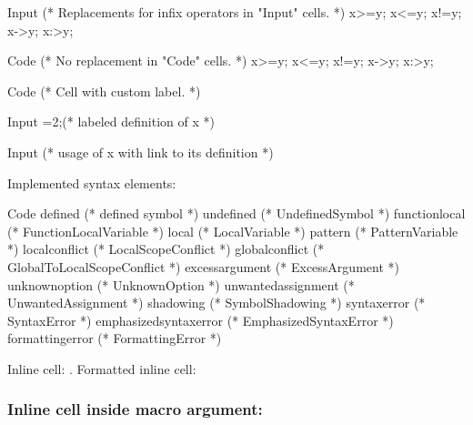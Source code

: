 \documentclass{article}
\begin{document}
\begin{mmaCell}{Input}
  (* Replacements for infix operators in "Input" cells. *)
  x>=y; x<=y; x!=y; x->y; x:>y;
\end{mmaCell}
\begin{mmaCell}{Code}
  (* No replacement in "Code" cells. *)
  x>=y; x<=y; x!=y; x->y; x:>y;
\end{mmaCell}
\begin{mmaCell}[label={(\mmaCellIndex)custom}]{Code}
  (* Cell with custom label. *)
\end{mmaCell}
\begin{mmaCell}{Input}
  =2;(* labeled definition of x *)
\end{mmaCell}
\begin{mmaCell}{Input}
  (* usage of x with link to its definition *)
\end{mmaCell}

Implemented syntax elements:
\begin{mmaCell}[
  defined=defined,
  undefined=undefined,
  functionlocal=functionlocal,
  local=local,
  pattern=pattern,
  localconflict=localconflict,
  globalconflict=globalconflict,
  excessargument=excessargument,
  unknownoption=unknownoption,
  unwantedassignment=unwantedassignment,
  shadowing=shadowing,
  syntaxerror=syntaxerror,
  emphasizedsyntaxerror=emphasizedsyntaxerror,
  formattingerror=formattingerror,
]{Code}
   defined (*  defined symbol *)
   undefined (* UndefinedSymbol *)
   functionlocal (* FunctionLocalVariable *)
   local (* LocalVariable *)
   pattern (* PatternVariable *)
   localconflict (* LocalScopeConflict *)
   globalconflict (* GlobalToLocalScopeConflict *)
   excessargument (* ExcessArgument *)
   unknownoption (* UnknownOption *)
   unwantedassignment (* UnwantedAssignment *)
   shadowing (* SymbolShadowing *)
   syntaxerror (* SyntaxError *)
   emphasizedsyntaxerror (* EmphasizedSyntaxError *)
   formattingerror (* FormattingError *)
\end{mmaCell}

Inline cell: .
Formatted inline cell:
\subsubsection*{
  Inline cell inside macro argument:
}
\end{document}
